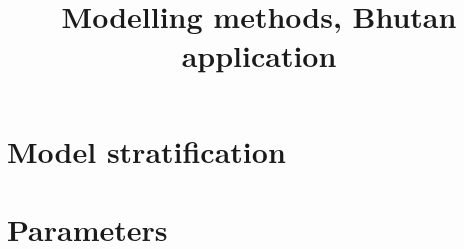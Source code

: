 \documentclass{article}
\title{Modelling methods, Bhutan application}
\begin{document}
\maketitle



\section{Model stratification}



\section{Parameters}


\newpage
\printbibliography
\end{document}

